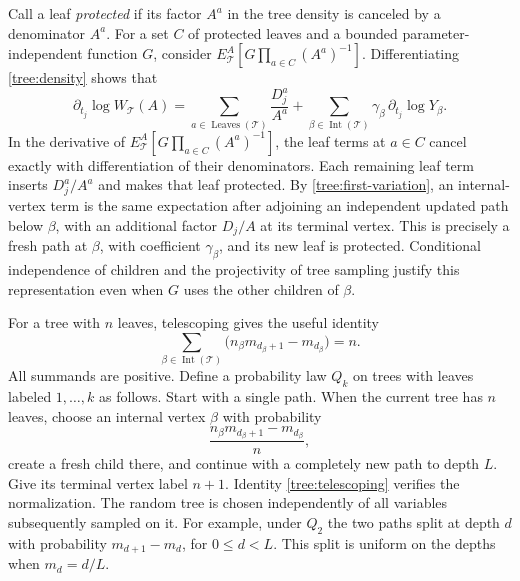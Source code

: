 Call a leaf \emph{protected} if its factor $A^a$ in the tree density is
canceled by a denominator $A^a$.  For a set $C$ of protected leaves and
a bounded parameter-independent function $G$, consider
$E_{\mathcal T}^A[G\prod_{a\in C}(A^a)^{-1}]$.
Differentiating
\eqref{tree:density} shows that
\[
 \partial_{t_j}\log W_{\mathcal T}(A)
   =\sum_{a\in\operatorname{Leaves}(\mathcal T)}\frac{D_j^a}{A^a}
      +\sum_{\beta\in\operatorname{Int}(\mathcal T)}
           \gamma_\beta\,\partial_{t_j}\log Y_\beta.
\]
In the derivative of
$E_{\mathcal T}^A[G\prod_{a\in C}(A^a)^{-1}]$, the leaf terms at
$a\in C$ cancel exactly with differentiation of their denominators.
Each remaining leaf term inserts $D_j^a/A^a$ and makes that leaf
protected.  By \eqref{tree:first-variation}, an internal-vertex term
is the same expectation after adjoining an independent updated path
below $\beta$, with an additional factor $D_j/A$ at its terminal
vertex.  This is precisely a fresh path at $\beta$, with coefficient
$\gamma_\beta$, and its new leaf is protected.  Conditional
independence of children and the projectivity of tree sampling justify
this representation even when $G$ uses the other children of $\beta$.

For a tree with $n$ leaves, telescoping gives the useful identity
\begin{equation}\label{tree:telescoping}
  \sum_{\beta\in\operatorname{Int}(\mathcal T)}
       \bigl(n_\beta m_{d_\beta+1}-m_{d_\beta}\bigr)=n.
\end{equation}
All summands are positive.  Define a probability law $Q_k$ on trees
with leaves labeled $1,\ldots,k$ as follows.  Start with a single path.
When the current tree has $n$ leaves, choose an internal vertex
$\beta$ with probability
\begin{equation}\label{tree:Q-rule}
  \frac{n_\beta m_{d_\beta+1}-m_{d_\beta}}{n},
\end{equation}
create a fresh child there, and continue with a completely new path
to depth $L$.  Give its terminal vertex label $n+1$.  Identity
\eqref{tree:telescoping} verifies the normalization.  The random tree
is chosen independently of all variables subsequently sampled on it.
For example, under $Q_2$ the two paths split at depth $d$ with probability
$m_{d+1}-m_d$, for $0\le d<L$. This split is uniform on the depths when
$m_d=d/L$.


